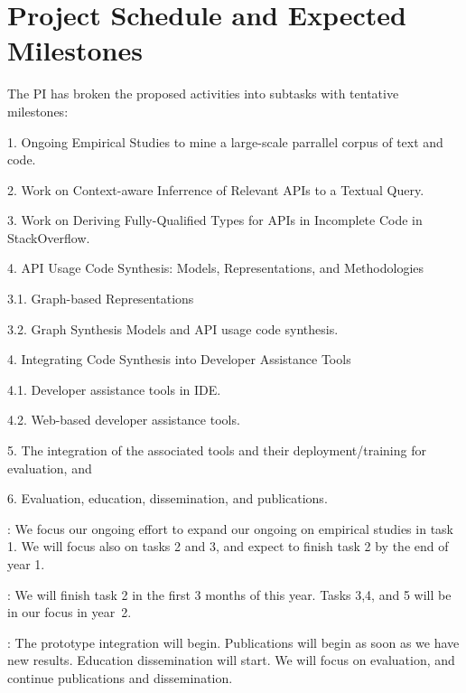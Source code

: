 \section{Project Schedule and Expected Milestones}
\label{plan-section}

The PI has broken the proposed activities into subtasks with
tentative milestones:


1. Ongoing Empirical Studies to mine a large-scale parrallel corpus of
text and code.
   
2. Work on Context-aware Inferrence of Relevant APIs to a Textual Query.

3. Work on Deriving Fully-Qualified Types for APIs in Incomplete Code
in StackOverflow.


4. API Usage Code Synthesis: Models, Representations, and
Methodologies

\hspace{0.1in}   3.1. Graph-based Representations

\hspace{0.1in}   3.2. Graph Synthesis Models and API usage code synthesis.


4. Integrating Code Synthesis into Developer Assistance Tools

\hspace{0.1in}   4.1. Developer assistance tools in IDE.

\hspace{0.1in}   4.2. Web-based developer assistance tools.


5. The integration of the associated tools and their
deployment/training for evaluation, and

6. Evaluation, education, dissemination, and publications.


: We focus our ongoing effort to expand our
ongoing on empirical studies in task 1. We will focus also on tasks 2
and 3, and expect to finish task 2 by the end of year 1.

: We will finish task 2 in the first 3 months of
this year. Tasks 3,4, and 5 will be in our focus in year~2.

: The prototype integration will
begin. Publications will begin as soon as we have new results.
Education dissemination will start. We will focus on evaluation, and
continue publications and dissemination.


